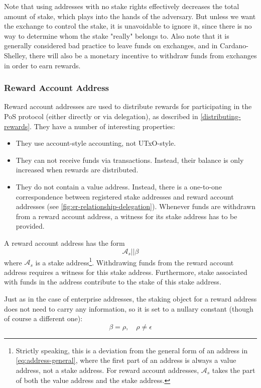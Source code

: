 \documentclass[11pt,a4paper]{article}
\begin{document}
Note that using addresses with no stake rights effectively decreases
the total amount of stake, which plays into the hands of the adversary.
But unless we want the exchange to control the stake, it is unavoidable to
ignore it, since there is no way to determine whom the stake "really" belongs
to. Also note that it is generally considered bad practice to leave funds on
exchanges, and in Cardano-Shelley, there will also be a monetary incentive to
withdraw funds from exchanges in order to earn rewards.

\subsubsection{Reward Account Address}
\label{reward-address}

Reward account addresses are used to distribute rewards for participating in
the PoS protocol (either directly or via delegation), as described in
\ref{distributing-rewards}. They have a number of interesting
properties:

\begin{itemize}
\item They use account-style accounting, not UTxO-style.
\item They can not receive funds via transactions. Instead, their
  balance is only increased when rewards are distributed.
\item They do not contain a value address. Instead, there is a
  one-to-one correspondence between registered stake addresses and reward
  account addresses (see \cref{fig:er-relationship-delegation}). Whenever funds
  are withdrawn from a reward account address, a witness for its stake address
  has to be provided.
\end{itemize}

A reward account address has the form
\[
\mathcal{A}_s \mathbin{||} \beta
\]
where \(\mathcal{A}_s\) is a stake address\footnote{Strictly speaking, this is a
deviation from the general form of an address in \cref{eq:address-general},
where the first part of an address is always a value address, not a stake
address. For reward account addresses, \(\mathcal{A}_s\) takes the part of both
the value address and the stake address.}. Withdrawing funds from the reward
account address requires a witness for this stake address. Furthermore, stake
associated with funds in the address contribute to the stake of this stake
address.

Just as in the case of enterprise addresses, the staking object for a reward
address does not need to carry any information, so it is set to a
nullary constant (though of course a different one):
\[
\beta = \rho, \quad \rho \neq \epsilon
\]
\end{document}
